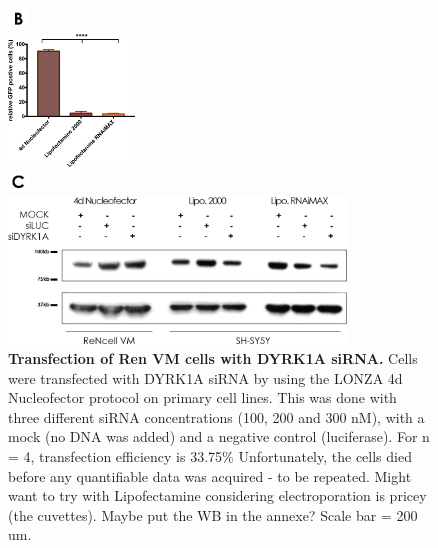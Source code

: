 \documentclass[onecolumn,10pt]{asme2ej}
\begin{document}
\begin{figure}[h]
	
	
	\includegraphics[width=0.05\textwidth]{figures/b}
	
	
	\begin{center}
		\includegraphics[width=0.3\textwidth]{figures/transfection.jpg}		
	\end{center}
	
	
	
	\includegraphics[width=0.05\textwidth]{figures/c}
	
	
	\begin{center}
		\includegraphics[width=0.8\textwidth]{figures/wb-sirna.jpg}	
	\end{center}
	
	\caption{\textbf{Transfection of Ren VM cells with DYRK1A siRNA.} Cells were transfected with DYRK1A siRNA by using the LONZA 4d Nucleofector protocol on primary cell lines. This was done with three different siRNA concentrations (100, 200 and 300 nM), with a mock (no DNA was added) and a negative control (luciferase). For n = 4, transfection efficiency is 33.75\% Unfortunately, the cells died before any quantifiable data was acquired - to be repeated. Might want to try with Lipofectamine considering electroporation is pricey (the cuvettes).
		Maybe put the WB in the annexe?
		Scale bar = 200 um.}
	\label{transfection}
\end{figure}
\end{document}
